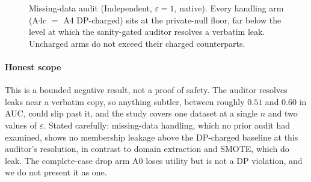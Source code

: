 \documentclass[conference]{IEEEtran}
\newcommand{\eps}{\varepsilon}
\begin{document}
\begin{figure}[t]
\centering
{}
\caption{Missing-data audit (Independent, $\eps{=}1$, native). Every handling arm (A4c $=$ A4
DP-charged) sits at the private-null floor, far below the level at which the sanity-gated auditor
resolves a verbatim leak. Uncharged arms do not exceed their charged counterparts.}
\label{fig:imp}
\end{figure}

\paragraph{Honest scope} This is a bounded negative result, not a proof of safety. The auditor
resolves leaks near a verbatim copy, so anything subtler, between roughly $0.51$ and $0.60$ in AUC,
could slip past it, and the study covers one dataset at a single $n$ and two values of $\eps$. Stated
carefully: missing-data handling, which no prior audit had examined, shows no membership leakage above
the DP-charged baseline at this auditor's resolution, in contrast to domain extraction and SMOTE, which
do leak. The complete-case drop arm A0 loses utility but is not a DP violation, and we do not present
it as one.
\end{document}
